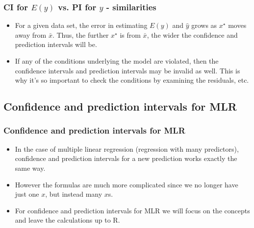 \documentclass[slidestop,compress,mathserif,12pt,t,professionalfonts,xcolor=table]{beamer}
\begin{document}

\begin{frame}
\frametitle{CI for $E(y)$ vs. PI for $y$ - similarities}

\begin{itemize}

\item For a given data set, the error in estimating $E(y)$ and $\hat{y}$ grows as $x^\star$ moves away from $\bar{x}$. Thus, the further $x^\star$ is from $\bar{x}$, the wider the confidence and prediction intervals will be.

\pause

\item If any of the conditions underlying the model are violated, then the confidence intervals and prediction intervals may be invalid as well. This is why it's so important to check the conditions by examining the residuals, etc.

\end{itemize}

\end{frame}


\subsection{Confidence and prediction intervals for MLR}


\begin{frame}
\frametitle{Confidence and prediction intervals for MLR}

\begin{itemize}

\item In the case of multiple linear regression (regression with many predictors), confidence and prediction intervals for a new prediction works exactly the same way.

\item However the formulas are much more complicated since we no longer have just one $x$, but instead many $x$s.

\item For confidence and prediction intervals for MLR we will focus on the concepts and leave the calculations up to R.

\end{itemize}

\end{frame}
\end{document}
